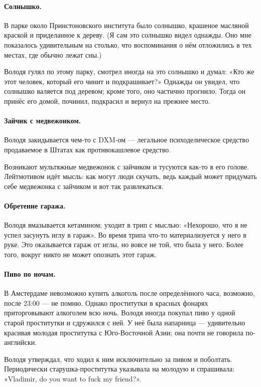 \documentclass{book}
\begin{document}
\paragraph{Солнышко.}
В парке около Принстоновского института было солнышко, крашеное масляной краской и приделанное к дереву.
(Я сам это солнышко видел однажды.
Оно мне показалось удивительным на столько, что воспоминания о нём отложились в тех местах, где обычно лежат сны.)

Володя гулял по этому парку, смотрел иногда на это солнышко и думал: «Кто же этот человек, который его чинит и подкрашивает?»
Однажды он увидел, что солнышко валяется под деревом;
кроме того, оно частично прогнило.
Тогда он принёс его домой, починил, подкрасил и вернул на прежнее место.

\paragraph{Зайчик с медвежонком.}
Володя закидывается чем-то с DXM-ом --- легальное психоделическое средство продаваемое в Штатах как противокашлевое средство.

Возникают мультяжные медвежонок с зайчиком и тусуются как-то в его голове.
Лейтмотивом идёт мысль: как могут люди скучать, ведь каждый может придумать себе медвежонка с зайчиком и вот так развлекаться.

\paragraph{Обретение гаража.}
Володя вмазывается кетамином; уходит в трип с мыслью: «Нехорошо, что я не успел засунуть иглу в гараж».
Во время трипа что-то материализуется у него в руке.
Это оказывается гараж от иглы, но вовсе не той, что была у него.
Более того, вокруг никто не может опознать этот гараж.

\paragraph{Пиво по ночам.}
В Амстердаме невозможно купить алкоголь после определённого часа, возможно, после 23:00 --- не помню.
Однако проститутки в красных фонарях приторговывают алкоголем всю ночь.
Володя иногда покупал пиво у одной старой проститутки и сдружился с ней.
У неё была напарница --- удивительно красивая молодая проститутка с Юго-Восточной Азии; она почти не говорила по-английски.

Володя утверждал, что ходил к ним исключительно за пивом и поболтать.
Периодически старушка-проститутка указывала на молодую и спрашивала: «Vladimir, do you want to fuck my friend?».
\end{document}
